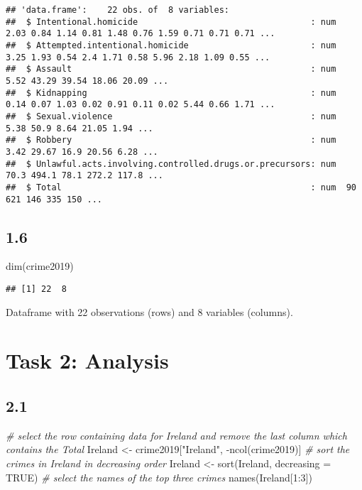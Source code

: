 \documentclass[
]{article}
\newenvironment{Shaded}{\begin{snugshade}}{\end{snugshade}}
\newcommand{\AttributeTok}[1]{\textcolor[rgb]{0.77,0.63,0.00}{#1}}
\newcommand{\CommentTok}[1]{\textcolor[rgb]{0.56,0.35,0.01}{\textit{#1}}}
\newcommand{\ConstantTok}[1]{\textcolor[rgb]{0.00,0.00,0.00}{#1}}
\newcommand{\DecValTok}[1]{\textcolor[rgb]{0.00,0.00,0.81}{#1}}
\newcommand{\FunctionTok}[1]{\textcolor[rgb]{0.00,0.00,0.00}{#1}}
\newcommand{\NormalTok}[1]{#1}
\newcommand{\OtherTok}[1]{\textcolor[rgb]{0.56,0.35,0.01}{#1}}
\newcommand{\SpecialCharTok}[1]{\textcolor[rgb]{0.00,0.00,0.00}{#1}}
\newcommand{\StringTok}[1]{\textcolor[rgb]{0.31,0.60,0.02}{#1}}
\begin{document}
\begin{verbatim}
## 'data.frame':    22 obs. of  8 variables:
##  $ Intentional.homicide                                  : num  2.03 0.84 1.14 0.81 1.48 0.76 1.59 0.71 0.71 0.71 ...
##  $ Attempted.intentional.homicide                        : num  3.25 1.93 0.54 2.4 1.71 0.58 5.96 2.18 1.09 0.55 ...
##  $ Assault                                               : num  5.52 43.29 39.54 18.06 20.09 ...
##  $ Kidnapping                                            : num  0.14 0.07 1.03 0.02 0.91 0.11 0.02 5.44 0.66 1.71 ...
##  $ Sexual.violence                                       : num  5.38 50.9 8.64 21.05 1.94 ...
##  $ Robbery                                               : num  3.42 29.67 16.9 20.56 6.28 ...
##  $ Unlawful.acts.involving.controlled.drugs.or.precursors: num  70.3 494.1 78.1 272.2 117.8 ...
##  $ Total                                                 : num  90 621 146 335 150 ...
\end{verbatim}

\hypertarget{section-5}{%
\subsection{1.6}\label{section-5}}

\begin{Shaded}
\begin{Highlighting}[]
\FunctionTok{dim}\NormalTok{(crime2019)}
\end{Highlighting}
\end{Shaded}

\begin{verbatim}
## [1] 22  8
\end{verbatim}

Dataframe with 22 observations (rows) and 8 variables (columns).

\hypertarget{task-2-analysis}{%
\section{Task 2: Analysis}\label{task-2-analysis}}

\hypertarget{section-6}{%
\subsection{2.1}\label{section-6}}

\begin{Shaded}
\begin{Highlighting}[]
\CommentTok{\# select the row containing data for Ireland and remove the last column which contains the Total}
\NormalTok{Ireland }\OtherTok{\textless{}{-}}\NormalTok{ crime2019[}\StringTok{"Ireland"}\NormalTok{, }\SpecialCharTok{{-}}\FunctionTok{ncol}\NormalTok{(crime2019)] }
\CommentTok{\# sort the crimes in Ireland in decreasing order}
\NormalTok{Ireland }\OtherTok{\textless{}{-}} \FunctionTok{sort}\NormalTok{(Ireland, }\AttributeTok{decreasing =} \ConstantTok{TRUE}\NormalTok{) }
\CommentTok{\# select the names of the top three crimes}
\FunctionTok{names}\NormalTok{(Ireland[}\DecValTok{1}\SpecialCharTok{:}\DecValTok{3}\NormalTok{]) }
\end{Highlighting}
\end{Shaded}
\end{document}
